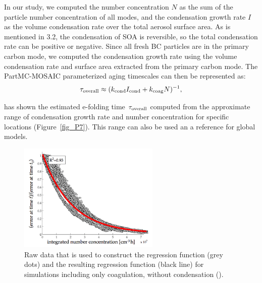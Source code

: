 \documentclass[12pt, fullpage]{uiucthesis2009}
\begin{document}
	In our study, we computed the number concentration $N$ as the sum of the particle number concentration of all modes, and the condensation growth rate $I$ as the volume condensation rate over the total aerosol surface area. As is mentioned in 3.2, the condensation of SOA is reversible, so the total condensation rate can be positive or negative. Since all fresh BC particles are in the primary carbon mode, we computed the condensation growth rate using the volume condensation rate and surface area extracted from the primary carbon mode. The PartMC-MOSAIC parameterized aging timescales can then be represented as:
	\begin{align}
	\tau_{\rm overall} \approx (k_{\rm cond}I_{\rm cond} + k_{\rm coag}N)^{-1},
	\end{align}
	
	\cite{Fierce2016} has shown the estimated e-folding time $\tau_{\rm overall}$ computed from the approximate range of condensation growth rate and number concentration for specific locations (Figure~\ref{fig_P7}). This range can also be used an a reference for global models.
	
	\begin{figure}[h] 
		\begin{center}
			\includegraphics[width = 0.6\textwidth]{Figure02}
			\caption[Raw data that is used to construct the regression function (grey dots) and the resulting regression function (black line) for simulations including only coagulation, without condensation (\cite{Fierce2016})]{\label{fig_P2}Raw data that is used to construct the regression function (grey dots) and the resulting regression function (black line) for simulations including only coagulation, without condensation (\cite{Fierce2016}).}
		\end{center}
	\end{figure}
	
\end{document}
